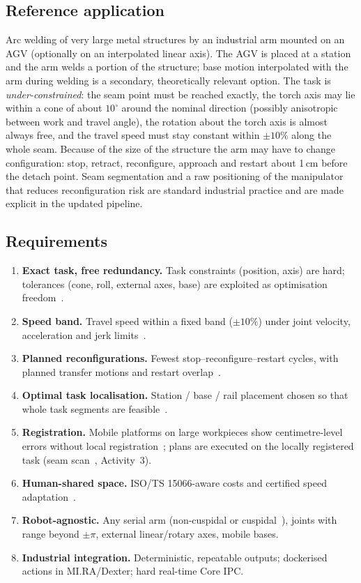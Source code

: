 \documentclass{plan4ari_report}
\begin{document}
\subsection{Reference application}
Arc welding of very large metal structures by an industrial arm mounted on an AGV (optionally on an interpolated linear axis). The AGV is placed at a station and the arm welds a portion of the structure; base motion interpolated with the arm during welding is a secondary, theoretically relevant option. The task is \emph{under-constrained}: the seam point must be reached exactly, the torch axis may lie within a cone of about $10^\circ$ around the nominal direction (possibly anisotropic between work and travel angle), the rotation about the torch axis is almost always free, and the travel speed must stay constant within $\pm10\%$ along the whole seam. Because of the size of the structure the arm may have to change configuration: stop, retract, reconfigure, approach and restart about 1\,cm before the detach point. Seam segmentation and a raw positioning of the manipulator that reduces reconfiguration risk are standard industrial practice and are made explicit in the updated pipeline.

\subsection{Requirements}\label{sec:req}
\begin{enumerate}[label=R\arabic*.]
\item \textbf{Exact task, free redundancy.} Task constraints (position, axis) are hard; tolerances (cone, roll, external axes, base) are exploited as optimisation freedom~\cite{demaeyer2017descartes,chen2025cooptimization}.
\item \textbf{Speed band.} Travel speed within a fixed band ($\pm10\%$) under joint velocity, acceleration and jerk limits~\cite{lange2016pathaccurate}.
\item \textbf{Planned reconfigurations.} Fewest stop--reconfigure--restart cycles, with planned transfer motions and restart overlap~\cite{yin2024dpbreakpoints,wang2025anytimetracking}.
\item \textbf{Optimal task localisation.} Station / base / rail placement chosen so that whole task segments are feasible~\cite{weingartshofer2021tcpbase,wachter2024tcpbase}.
\item \textbf{Registration.} Mobile platforms on large workpieces show centimetre-level errors without local registration~\cite{zhao2021mobilemachining}; plans are executed on the locally registered task (seam scan~\cite{wang2026torchposture}, Activity~3).
\item \textbf{Human-shared space.} ISO/TS 15066-aware costs and certified speed adaptation~\cite{faroni2022safetyaware,gursoy2026cosmik}.
\item \textbf{Robot-agnostic.} Any serial arm (non-cuspidal or cuspidal~\cite{elias2025cuspidal}), joints with range beyond $\pm\pi$, external linear/rotary axes, mobile bases.
\item \textbf{Industrial integration.} Deterministic, repeatable outputs; dockerised actions in MI.RA/Dexter; hard real-time Core IPC.
\end{enumerate}
\end{document}
